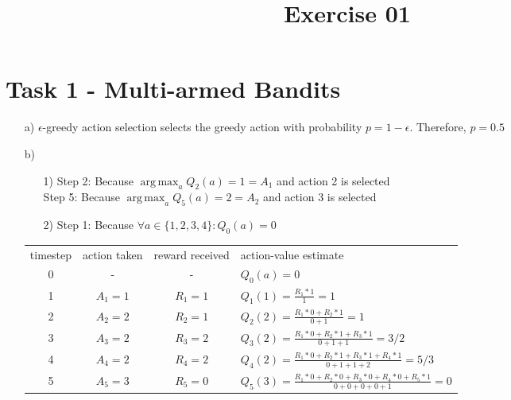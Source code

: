 \documentclass[a4paper]{article}
\date{}
\author{}
\title{\textbf{Exercise 01}}
\DeclareMathOperator*{\argmax}{arg\,max}
\begin{document}
	\maketitle 
	\thispagestyle{fancy}
	
    \section*{Task 1 - Multi-armed Bandits}
    \begin{itemize}
    \item[a)] $\epsilon$-greedy action selection selects the greedy action with probability $p=1-\epsilon$. Therefore, $p=0.5$
    \item[b)]
    	\begin{itemize}
    		\item[1)] Step 2: Because $\argmax_a Q_2(a) = 1 = A_1$ and action 2 is selected \\
    				  Step 5: Because $\argmax_a Q_5(a) = 2 = A_2$ and action 3 is selected \\
    		\item[2)] Step 1: Because $\forall a \in \{1,2,3,4\}: Q_0(a) = 0$
    	\end{itemize}
    \vspace{.3in}
    \begin{tabularx}{\linewidth}{c | c | c | l}
    	timestep & action taken & reward received & action-value estimate \\ 
    	0 & - & -  & $Q_0(a) = 0$ \\[2ex]
    	1 & $A_1=1$ & $R_1=1$ & $Q_1(1) = \frac{R_1*1}{1} = 1$ \\[2ex]
    	2 & $A_2=2$ & $R_2=1$ & $Q_2(2) = \frac{R_1*0+R_2*1}{0+1} = 1$ \\[2ex]
    	3 & $A_3=2$ & $R_3=2$ & $Q_3(2) = \frac{R_1*0+R_2*1+R_3*1}{0+1+1} = 3/2$ \\[2ex]
    	4 & $A_4=2$ & $R_4=2$ & $Q_4(2) = \frac{R_1*0+R_2*1+R_3*1+R_4*1}{0+1+1+2} = 5/3$  \\[2ex]
    	5 & $A_5=3$ & $R_5=0$ & $Q_5(3) = \frac{R_1*0+R_2*0+R_3*0+R_4*0+R_5*1}{0+0+0+0+1} = 0$
    \end{tabularx}
    \end{itemize}

    
\end{document}
